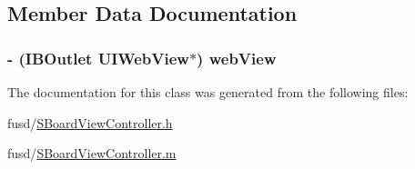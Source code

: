 \subsection{\-Member \-Data \-Documentation}
\hypertarget{interface_s_board_view_controller_ac1677bf37afc177b5078d649a3f1cea6}{
\subsubsection[{web\-View}]{\setlength{\rightskip}{0pt plus 5cm}-\/ (\-I\-B\-Outlet \-U\-I\-Web\-View$\ast$) {\bf web\-View}}}
\label{interface_s_board_view_controller_ac1677bf37afc177b5078d649a3f1cea6}


\-The documentation for this class was generated from the following files\-:\begin{DoxyCompactItemize}
\item 
fusd/\hyperlink{_s_board_view_controller_8h}{\-S\-Board\-View\-Controller.\-h}\item 
fusd/\hyperlink{_s_board_view_controller_8m}{\-S\-Board\-View\-Controller.\-m}\end{DoxyCompactItemize}
